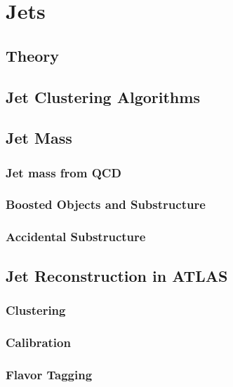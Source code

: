 \chapter{Jets}
\section{Theory}
\section{Jet Clustering Algorithms}
\section{Jet Mass}
\subsection{Jet mass from QCD}
\subsection{Boosted Objects and Substructure}
\subsection{Accidental Substructure}
\section{Jet Reconstruction in ATLAS}
\subsection{Clustering}
\subsection{Calibration}
\subsection{Flavor Tagging}
